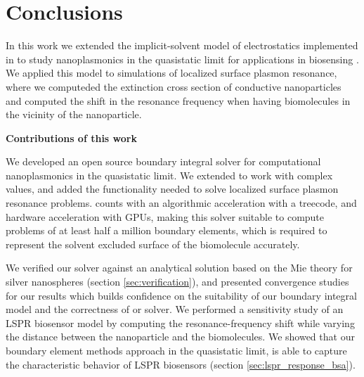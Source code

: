 \chapter{Conclusions}

In this work we extended the implicit-solvent model of electrostatics implemented in \pygbe \cite{CooperClementiBarba2015}
to study nanoplasmonics in the quasistatic limit for applications in biosensing \cite{ClementiETal2017, ClementiETal2019}.
We applied this model to simulations of localized surface plasmon resonance, where we computeded the extinction cross section of 
conductive nanoparticles and computed the shift in the resonance frequency when having biomolecules in the vicinity of the 
nanoparticle.

\textbf{Contributions of this work}

We developed an open source boundary integral solver for computational nanoplasmonics in the quasistatic limit. We extended \pygbe to work 
with complex values, and added the functionality needed to solve localized surface plasmon resonance problems. \pygbe 
counts with an algorithmic acceleration with a treecode, and hardware acceleration with GPUs, making this solver 
suitable to compute problems of at least half a million boundary elements, which is required to represent the solvent excluded 
surface of the biomolecule accurately.

We verified our solver against an analytical solution based on the Mie theory for silver nanospheres (section \ref{sec:verification}), and 
presented convergence studies for our results which builds confidence on the suitability of our boundary integral model and the  
correctness of or solver. 
We performed a sensitivity study of an LSPR biosensor model by computing the resonance-frequency shift
while varying the distance between the nanoparticle and the biomolecules. We showed that our boundary element methods approach in
the quasistatic limit, is able to capture the characteristic behavior of LSPR biosensors (section \ref{sec:lspr_response_bsa}).

